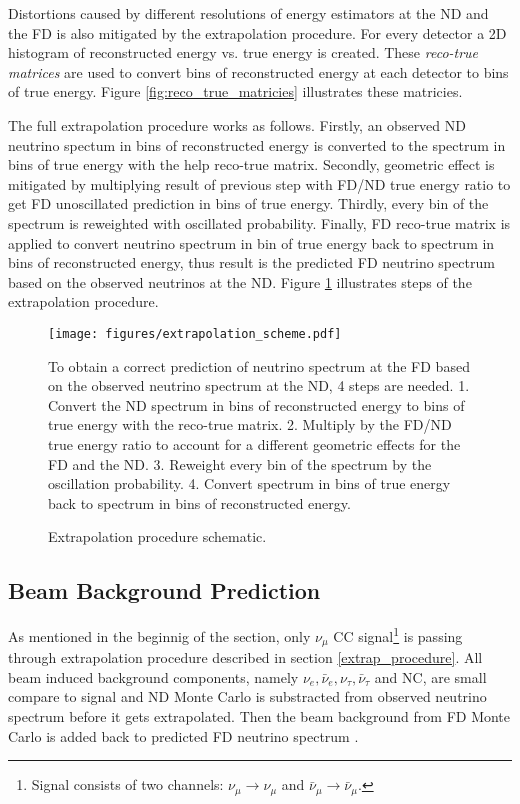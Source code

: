 Distortions caused by different resolutions of energy estimators at the ND and the FD is also mitigated by
the extrapolation procedure. For every detector a 2D histogram of reconstructed energy vs. true energy
is created. These \textit{reco-true matrices} are used to convert bins of reconstructed energy at
each detector to bins of true energy. Figure \ref{fig:reco_true_matricies} illustrates these matricies.

The full extrapolation procedure works as follows. Firstly, an observed ND neutrino spectum in bins of 
reconstructed energy is converted to the spectrum in bins of true energy with the help reco-true 
matrix. Secondly, geometric effect is mitigated by multiplying result of previous step with FD/ND 
true energy ratio to get FD unoscillated prediction in bins of true energy. Thirdly, every bin of the 
spectrum is reweighted with oscillated probability. Finally, FD reco-true matrix is applied to 
convert neutrino spectrum in bin of true energy back to spectrum in bins of reconstructed energy,
thus result is the predicted FD neutrino spectrum based on the observed neutrinos at the ND. 
Figure \ref{fig:extrap_scheme} illustrates steps of the extrapolation procedure.
\begin{figure}[!h]
\centering
\texttt{[image: figures/extrapolation\_scheme.pdf]}
\caption{Extrapolation procedure schematic.}
{To obtain a correct prediction of neutrino spectrum at the FD based on the observed neutrino 
spectrum at the ND, 4 steps are needed. 1. Convert the ND spectrum in bins of reconstructed energy to
bins of true energy with the reco-true matrix. 2. Multiply by the FD/ND true energy ratio to account
for a different geometric effects for the FD and the ND. 3. Reweight every bin of the spectrum by
the oscillation probability. 4. Convert spectrum in bins of true energy back to spectrum in bins of
reconstructed energy. }
\label{fig:extrap_scheme}
\end{figure}

\subsection{Beam Background Prediction}
As mentioned in the beginnig of the section, only $\nu_\mu$ CC signal\footnote{Signal consists of two
channels: $\nu_\mu \rightarrow \nu_\mu$ and $\bar\nu_\mu \rightarrow \bar\nu_\mu$.} is passing 
through extrapolation procedure described in section \ref{extrap_procedure}. All beam induced 
background components, namely $\nu_e, \bar\nu_e, \nu_\tau, \bar\nu_\tau$ and NC, are small compare 
to signal and ND Monte Carlo is substracted from observed neutrino spectrum before it gets extrapolated.
Then the beam background from FD Monte Carlo is added back to predicted FD neutrino spectrum \cite{extrap_technote}. 

